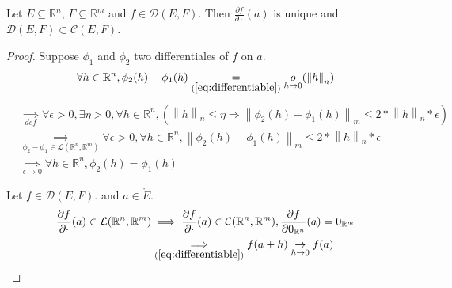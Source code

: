 \documentclass[11pt,en]{elegantpaper}
\newcommand\norm[1]{\left\lVert#1\right\rVert}
\begin{document}
\begin{proposition}\label{prop:differential_unique}
  {\normalfont Let $E \subseteq \mathbb{R}^n$, $F \subseteq \mathbb{R}^m$ and $f \in \mathcal{D}(E,F)$.
  Then $\frac{\partial f}{\partial \cdot}(a)$ is unique and $\mathcal{D}(E,F) \subset \mathcal{C}(E,F)$.}
\end{proposition}

\begin{proof}
  Suppose $\phi_1$ and $\phi_2$ two differentiales of $f$ on $a$. \begin{equation*}
    \begin{gathered}
      \forall h \in \mathbb{R}^n, \phi_2(h) - \phi_1(h) \underset{(\ref{eq:differentiable})} = \underset{h \to 0}o(\norm h _n)
    \end{gathered}
  \end{equation*}
  \begin{equation*}
    \begin{split}
      & \underset{def} \implies \forall \epsilon > 0, \exists \eta > 0, \forall h \in \mathbb{R}^n, (\norm h _n \leq \eta \Rightarrow \norm{\phi_2(h) - \phi_1(h)}_m \leq 2 * \norm h _n * \epsilon) \\
      & \underset{\phi_2 - \phi_1 \in \mathcal{L}(\mathbb{R}^n,\mathbb{R}^m)} \implies \forall \epsilon > 0, \forall h \in \mathbb{R}^n, \norm{\phi_2(h) - \phi_1(h)}_m \leq 2 * \norm h _n * \epsilon \\
      & \underset{\epsilon \to 0} \implies \forall h \in \mathbb{R}^n, \phi_2(h) = \phi_1(h)
    \end{split}
  \end{equation*}
  
  Let $f \in \mathcal{D}(E,F).$ and $a \in \mathring{E}$. \begin{equation*}
    \begin{split}
      \frac{\partial f}{\partial \cdot}(a) \in \mathcal{L}(\mathbb{R}^n,\mathbb{R}^m) & \implies \frac{\partial f}{\partial \cdot}(a) \in \mathcal{C}(\mathbb{R}^n,\mathbb{R}^m), \frac{\partial f}{\partial 0_{\mathbb{R}^n}}(a) = 0_{\mathbb{R}^m} \label{} \\
      & \underset{(\ref{eq:differentiable})} \implies f(a + h) \underset{h \to 0} \to f(a)
    \end{split}
  \end{equation*}
\end{proof}
\end{document}
